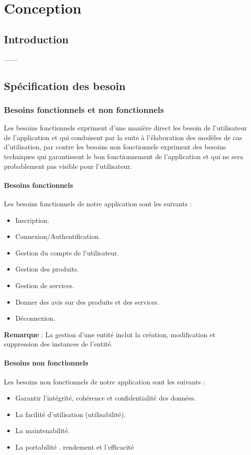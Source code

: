 \chapter{Conception}
\section{Introduction}
------\newline

\section{Spécification des besoin }
\subsection{Besoins fonctionnels et non fonctionnels }
\par Les besoins fonctionnels expriment d’une manière direct les besoin de l’utilisateur de l’application et qui conduisent par la suite à l'élaboration des modèles de cas d'utilisation, par contre les besoins non fonctionnels expriment des besoins techniques qui garantissent le bon fonctionnement de l'application et qui ne sera probablement pas visible pour l’utilisateur.
\subsubsection{Besoins fonctionnels }
\par Les besoins fonctionnels de notre application sont les suivants :
\begin{itemize}[label=\textbullet] 
    \item Inscription.
    \item Connexion/Authentification.
    \item Gestion du compte de l’utilisateur.
    \item Gestion des produits.
    \item Gestion de services.
    \item Donner des avis sur des produits et des services.
    \item Déconnexion.
\end{itemize}
\textbf{Remarque} : La gestion d’une entité inclut la création, modification et suppression des instances de l'entité.
\subsubsection{Besoins non fonctionnels }
\par Les besoins non fonctionnels de notre application sont les suivants :
\begin{itemize}[label=\textbullet] 
    \item Garantir l'intégrité, cohérence et confidentialité des données.
    \item La facilité d'utilisation (utilisabilité).
    \item La maintenabilité.
    \item La portabilité .
    \itemLe rendement et l’efficacité 
\end{itemize}
